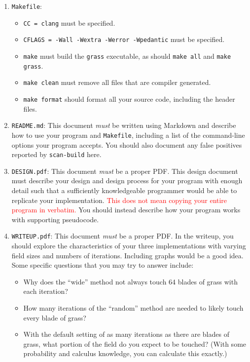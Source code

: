 \documentclass[11pt]{article}
\begin{document}
\begin{enumerate}
    \item \texttt{Makefile}: \begin{itemize}
        \item \texttt{CC = clang} must be specified.
        \item \texttt{CFLAGS = -Wall -Wextra -Werror -Wpedantic} must be specified.
        \item \texttt{make} must build the \texttt{grass} executable, as should \texttt{make all} and \texttt{make grass}.
        \item \texttt{make clean} must remove all files that are compiler generated.
        \item \texttt{make format} should format all your source code, including the header files.
    \end{itemize}
    \item \texttt{README.md}: This document \emph{must} be written using Markdown and describe how to use your program and \texttt{Makefile}, including a list of the command-line options your program accepts. You should also document any false positives reported by \texttt{scan-build} here.
    \item \texttt{DESIGN.pdf}: This document \emph{must} be a proper PDF. This design document must describe your design and design process for your program with enough detail such that a sufficiently knowledgeable programmer would be able to replicate your implementation. \textcolor{red}{This does not mean copying your entire program in verbatim.} You should instead describe how your program works with supporting pseudocode.
    \item \texttt{WRITEUP.pdf}: This document \emph{must} be a proper PDF. In the writeup, you should explore the characteristics of your three implementations with varying field sizes and numbers of iterations. Including graphs would be a good idea. Some specific questions that you may try to answer include: \begin{itemize}
        \item Why does the ``wide'' method not always touch 64 blades of grass with each iteration?
        \item How many iterations of the ``random'' method are needed to likely touch every blade of grass?
        \item With the default setting of as many iterations as there are blades of grass, what portion of the field do you expect to be touched? (With some probability and calculus knowledge, you can calculate this exactly.)
    \end{itemize}
\end{enumerate}
\end{document}
